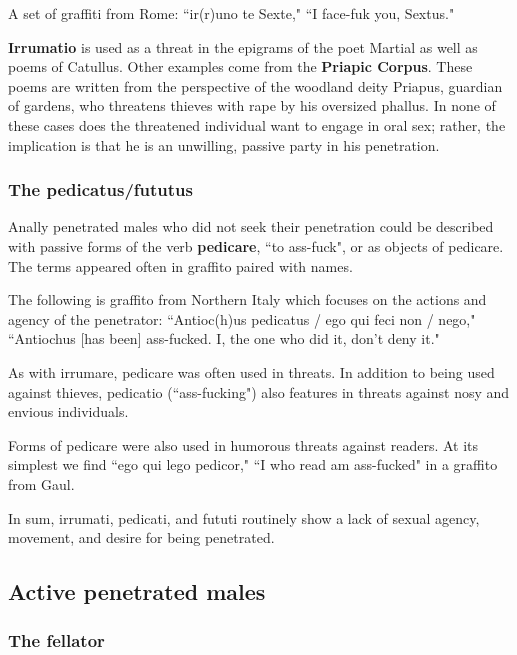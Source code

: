\begin{eg}
    A set of graffiti from Rome: ``ir(r)uno te Sexte," ``I face-fuk you, Sextus."
\end{eg}

\textbf{Irrumatio} is used as a threat in the epigrams of the poet Martial as well as poems of Catullus. Other examples come from the \textbf{Priapic Corpus}. These poems are written from the perspective of the woodland deity Priapus, guardian of gardens, who threatens thieves with rape by his oversized phallus. In none of these cases does the threatened individual want to engage in oral sex; rather, the implication is that he is an unwilling, passive party in his penetration.

\subsubsection{The pedicatus/fututus}

Anally penetrated males who did not seek their penetration could be described with passive forms of the verb \textbf{pedicare}, ``to ass-fuck", or as objects of pedicare. The terms appeared often in graffito paired with names.

\begin{eg}
    The following is graffito from Northern Italy which focuses on the actions and agency of the penetrator: ``Antioc(h)us pedicatus / ego qui feci non / nego," ``Antiochus [has been] ass-fucked. I, the one who did it, don't deny it."
\end{eg}

As with irrumare, pedicare was often used in threats. In addition to being used against thieves, pedicatio (``ass-fucking") also features in threats against nosy and envious individuals.

Forms of pedicare were also used in humorous threats against readers. At its simplest we find ``ego qui lego pedicor," ``I who read am ass-fucked" in a graffito from Gaul.

In sum, irrumati, pedicati, and fututi routinely show a lack of sexual agency, movement, and desire for being penetrated.


\subsection{Active penetrated males}


\subsubsection{The fellator}

